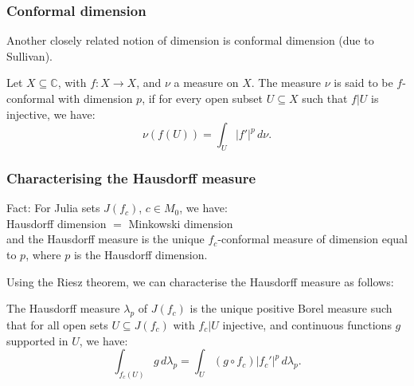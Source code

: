 \documentclass{beamer} %
\theoremstyle{definition} %
\newcommand{\Cplx}{\mathbb{C}}
\begin{document}
\begin{frame}\frametitle{Conformal dimension}
    Another closely related notion of dimension is conformal dimension (due to Sullivan).
    
    Let $X \subseteq \Cplx$, with $f:X\to X$, and $\nu$ a measure on $X$. The measure $\nu$ is said to be
    $f$-conformal with dimension $p$, if for every open subset $U \subseteq X$ such that $f|U$ is injective, we have:
    \begin{equation*}
        \nu(f(U)) = \int_{U} |f'|^p\,d\nu.
    \end{equation*}
    
    
    


%     
\end{frame}

\begin{frame}\frametitle{Characterising the Hausdorff measure}
    Fact: For Julia sets $J(f_c)$, $c \in M_0$, we have:\\
    Hausdorff dimension $=$ Minkowski dimension\\
    and the Hausdorff measure is the unique $f_c$-conformal measure of dimension equal to $p$, where $p$ is the Hausdorff dimension.
    
    Using the Riesz theorem, we can characterise the Hausdorff measure as follows:
    \begin{theorem}
        The Hausdorff measure $\lambda_p$ of $J(f_c)$ is the unique positive Borel measure such that for all open sets $U\subseteq J(f_c)$ with $f_c|U$ injective,
        and continuous functions $g$ supported in $U$, we have:
        \begin{equation*}
            \int_{f_c(U)} g\,d\lambda_p = \int_U (g\circ f_c)|f_c'|^p\,d\lambda_p.
        \end{equation*}
    \end{theorem}
\end{frame}
\end{document}
